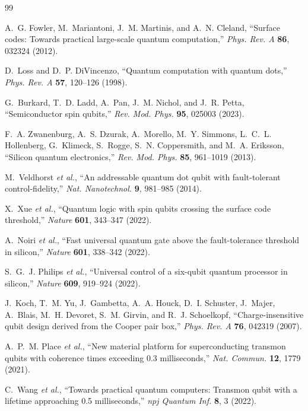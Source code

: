 \documentclass[11pt,letterpaper]{article}
\theoremstyle{definition}
\begin{document}
\begin{thebibliography}{99}

A.~G. Fowler, M.~Mariantoni, J.~M. Martinis, and A.~N. Cleland, ``Surface codes: Towards practical large-scale quantum computation,'' \textit{Phys. Rev. A} \textbf{86}, 032324 (2012).

D.~Loss and D.~P. DiVincenzo, ``Quantum computation with quantum dots,'' \textit{Phys. Rev. A} \textbf{57}, 120--126 (1998).

G.~Burkard, T.~D. Ladd, A.~Pan, J.~M. Nichol, and J.~R. Petta, ``Semiconductor spin qubits,'' \textit{Rev. Mod. Phys.} \textbf{95}, 025003 (2023).

F.~A. Zwanenburg, A.~S. Dzurak, A.~Morello, M.~Y. Simmons, L.~C.~L. Hollenberg, G.~Klimeck, S.~Rogge, S.~N. Coppersmith, and M.~A. Eriksson, ``Silicon quantum electronics,'' \textit{Rev. Mod. Phys.} \textbf{85}, 961--1019 (2013).

M.~Veldhorst \textit{et al.}, ``An addressable quantum dot qubit with fault-tolerant control-fidelity,'' \textit{Nat. Nanotechnol.} \textbf{9}, 981--985 (2014).

X.~Xue \textit{et al.}, ``Quantum logic with spin qubits crossing the surface code threshold,'' \textit{Nature} \textbf{601}, 343--347 (2022).

A.~Noiri \textit{et al.}, ``Fast universal quantum gate above the fault-tolerance threshold in silicon,'' \textit{Nature} \textbf{601}, 338--342 (2022).

S.~G.~J. Philips \textit{et al.}, ``Universal control of a six-qubit quantum processor in silicon,'' \textit{Nature} \textbf{609}, 919--924 (2022).

J.~Koch, T.~M. Yu, J.~Gambetta, A.~A. Houck, D.~I. Schuster, J.~Majer, A.~Blais, M.~H. Devoret, S.~M. Girvin, and R.~J. Schoelkopf, ``Charge-insensitive qubit design derived from the Cooper pair box,'' \textit{Phys. Rev. A} \textbf{76}, 042319 (2007).

A.~P.~M. Place \textit{et al.}, ``New material platform for superconducting transmon qubits with coherence times exceeding 0.3 milliseconds,'' \textit{Nat. Commun.} \textbf{12}, 1779 (2021).

C.~Wang \textit{et al.}, ``Towards practical quantum computers: Transmon qubit with a lifetime approaching 0.5 milliseconds,'' \textit{npj Quantum Inf.} \textbf{8}, 3 (2022).


\end{thebibliography}
\end{document}
